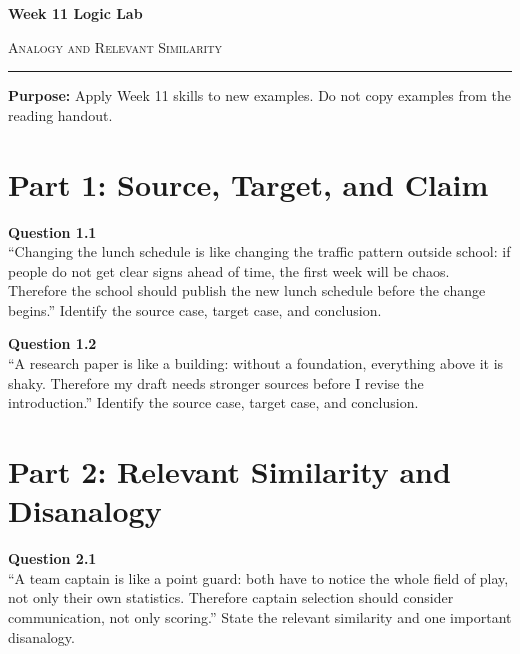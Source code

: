 \documentclass[12pt]{article}
\begin{document}
\begin{center}
{\LARGE\bfseries Week 11 Logic Lab}\par\vspace{0.05em}
{\large\scshape Analogy and Relevant Similarity}\par\vspace{0.1em}
\rule{0.78\textwidth}{0.5pt}\par\vspace{0.15em}
\end{center}

\noindent\textbf{Purpose:} Apply Week 11 skills to new examples. Do not copy examples from the reading handout.

\vspace{0.3em}

\section*{Part 1: Source, Target, and Claim}

\textbf{Question 1.1}\\[-0.15em]
``Changing the lunch schedule is like changing the traffic pattern outside school: if people do not get clear signs ahead of time, the first week will be chaos. Therefore the school should publish the new lunch schedule before the change begins.'' Identify the source case, target case, and conclusion.


\textbf{Question 1.2}\\[-0.15em]
``A research paper is like a building: without a foundation, everything above it is shaky. Therefore my draft needs stronger sources before I revise the introduction.'' Identify the source case, target case, and conclusion.


\newpage

\section*{Part 2: Relevant Similarity and Disanalogy}

\textbf{Question 2.1}\\[-0.15em]
``A team captain is like a point guard: both have to notice the whole field of play, not only their own statistics. Therefore captain selection should consider communication, not only scoring.'' State the relevant similarity and one important disanalogy.
\end{document}

